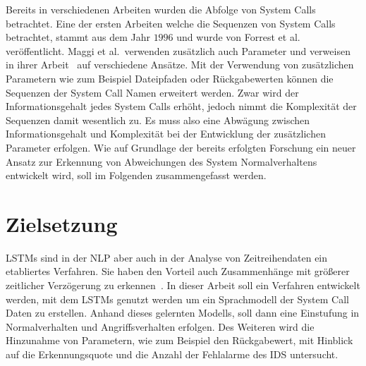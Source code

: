 Bereits in verschiedenen Arbeiten wurden die Abfolge von System Calls betrachtet.
Eine der ersten Arbeiten welche die Sequenzen von System Calls betrachtet, stammt aus dem Jahr $1996$ und wurde von Forrest et al.~\cite{FORREST} veröffentlicht.
Maggi et al.\ verwenden zusätzlich auch Parameter und verweisen in ihrer Arbeit~\cite{MAGGI} auf verschiedene Ansätze.
Mit der Verwendung von zusätzlichen Parametern wie zum Beispiel Dateipfaden oder Rückgabewerten können die Sequenzen der System Call Namen erweitert werden.
Zwar wird der Informationsgehalt jedes System Calls erhöht, jedoch nimmt die Komplexität der Sequenzen damit wesentlich zu. 
Es muss also eine Abwägung zwischen Informationsgehalt und Komplexität bei der Entwicklung der zusätzlichen Parameter erfolgen.
Wie auf Grundlage der bereits erfolgten Forschung ein neuer Ansatz zur Erkennung von Abweichungen des System Normalverhaltens entwickelt wird, soll im Folgenden zusammengefasst werden.





\section{Zielsetzung}\label{sec:Forschungsfrage}

\acfp{LSTM} sind in der \ac{NLP} aber auch in der Analyse von Zeitreihendaten ein etabliertes Verfahren.
Sie haben den Vorteil auch Zusammenhänge mit größerer zeitlicher Verzögerung zu erkennen~\cite{HOCHREITER}.
In dieser Arbeit soll ein Verfahren entwickelt werden, mit dem \acp{LSTM} genutzt werden um ein Sprachmodell der System Call Daten zu erstellen.
Anhand dieses gelernten Modells, soll dann eine Einstufung in Normalverhalten und Angriffsverhalten erfolgen.
Des Weiteren wird die Hinzunahme von Parametern, wie zum Beispiel den Rückgabewert, mit Hinblick auf die Erkennungsquote und die Anzahl der Fehlalarme des \acf{IDS} untersucht.

